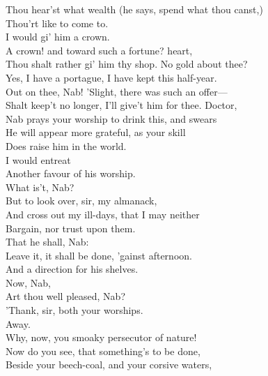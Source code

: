 \documentclass[a4paper,oneside]{memoir}
\begin{document}
\begin{drama*}
Thou hear'st what wealth (he says, spend what thou canst,)\\
Thou'rt like to come to.\\
\druggerspeaks {} I would gi' him a crown.\\
\facespeaks A crown! and toward such a fortune? heart,\\
Thou shalt rather gi' him thy shop. No gold about thee?\\
\druggerspeaks Yes, I have a portague, I have kept this half-year.\\
\facespeaks Out on thee, Nab! 'Slight, there was such an offer---\\
Shalt keep't no longer, I'll give't him for thee. Doctor,\\
Nab prays your worship to drink this, and swears\\
He will appear more grateful, as your skill\\
Does raise him in the world.\\
\druggerspeaks {} I would entreat\\
Another favour of his worship.\\
\facespeaks What is't, Nab?\\
\druggerspeaks {} But to look over, sir, my almanack,\\
And cross out my ill-days, that I may neither\\
Bargain, nor trust upon them.\\
\facespeaks {} That he shall, Nab:\\
Leave it, it shall be done, 'gainst afternoon.\\
\subtlespeaks And a direction for his shelves.\\
\facespeaks {} Now, Nab,\\
Art thou well pleased, Nab?\\
\druggerspeaks {} 'Thank, sir, both your worships.\\
\facespeaks {} Away.\\
Why, now, you smoaky persecutor of nature!\\
Now do you see, that something's to be done,\\
Beside your beech-coal, and your corsive waters,\\

\end{drama*}
\end{document}
